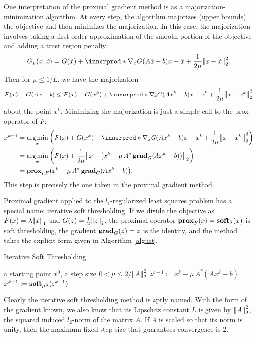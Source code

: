 One interpretation of the proximal gradient method is as a majorization-minimization algorithm. At every step, the algorithm majorizes (upper bounds) the objective and then minimizes the majorization. In this case, the majorization involves taking a first-order approximation of the smooth portion of the objective and adding a trust region penalty:
\begin{equation}
 G_{\mu}(x, \tilde{x}) = G(\tilde{x}) + \innerprod*{\nabla_x G(A\tilde{x} - b)}{x - \tilde{x}} + \frac{1}{2\mu}\norm{2}{x - \tilde{x}}^2.
\end{equation}
Then for $\mu \le 1/L$, we have the majorization
\begin{equation}
 F(x) + G(Ax - b) \le F(x) + G(x^{k}) + \innerprod*{\nabla_x G(Ax^{k} - b)}{x - x^{k}} + \frac{1}{2\mu}\norm{2}{x - x^{k}}^2
\end{equation}
about the point $x^{k}$. Minimizing the majorization is just a simple call to the prox operator of $F$:
\begin{align}
 x^{k+1} &= \argmin_{x} \; \paren*{F(x) + G(x^{k}) + \innerprod*{\nabla_x G(Ax^{k} - b)}{x - x^{k}} + \frac{1}{2\mu}\norm{2}{x - x^{k}}^2}\nonumber\\
 &= \argmin_{x} \; \paren*{F(x) + \frac{1}{2\mu}\norm{2}{x - \paren*{x^{k} - \mu \, A^* \grad_G(Ax^k - b)}}}\nonumber\\
 &= \prox_{\mu F}\paren*{x^{k} - \mu \, A^* \grad_G(Ax^k - b)}.
\end{align}
This step is precisely the one taken in the proximal gradient method.

Proximal gradient applied to the $l_1$-regularized least squares problem has a special name: iterative soft thresholding. If we divide the objective as $F(x) = \lambda\norm{1}{x}$ and $G(z) = \frac{1}{2}\norm{2}{z}$, the proximal operator $\prox_{F}(x) = \soft_{\lambda}(x)$ is soft thresholding, the gradient $\grad_{G}(z) = z$ is the identity, and the method takes the explicit form given in Algorithm \ref{alg:ist}.
\begin{algorithm}[H]
 \caption{Iterative Soft Thresholding}
 \label{alg:ist}
 \begin{algorithmic}
  \GIVEN a starting point $x^0$, a step size $0 < \mu \le 2/\norm{2}{A}^2$
  \REPEAT
  \STATE $z^{k+1} \coloneqq x^k - \mu \, A^*(Ax^k - b)$
  \STATE $x^{k+1} \coloneqq \soft_{\mu \lambda}(z^{k+1})$
 \end{algorithmic}
\end{algorithm}\noindent
Clearly the iterative soft thresholding method is aptly named. With the form of the gradient known, we also know that its Lipschitz constant $L$ is given by $\norm{2}{A}^2$, the squared induced $l_2$-norm of the matrix $A$. If $A$ is scaled so that its norm is unity, then the maximum fixed step size that guarantees convergence is $2$.

